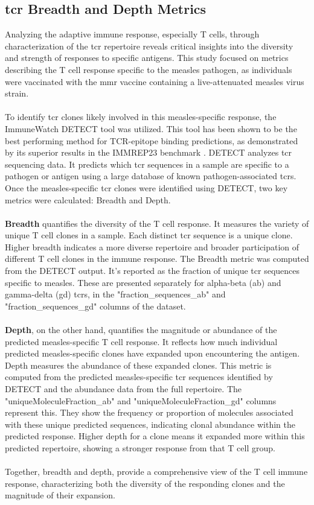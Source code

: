 \documentclass[12pt,a4paper]{report}
\begin{document}
\subsection{\gls{tcr} Breadth and Depth Metrics}
Analyzing the adaptive immune response, especially T cells, through characterization of the \gls{tcr} repertoire reveals critical insights into the diversity and strength of responses to specific antigens. This study focused on metrics describing the T cell response specific to the measles pathogen, as individuals were vaccinated with the \gls{mmr} vaccine containing a live-attenuated measles virus strain.\\
\\
To identify \gls{tcr} clones likely involved in this measles-specific response, the ImmuneWatch DETECT tool \cite{ImmuneDetectDocs} was utilized. This tool has been shown to be the best performing method for TCR-epitope binding predictions, as demonstrated by its superior results in the IMMREP23 benchmark \cite{benchmarking_paper_2024}. DETECT analyzes \gls{tcr} sequencing data. It predicts which \gls{tcr}  sequences in a sample are specific to a pathogen or antigen using a large database of known pathogen-associated \gls{tcr}s. Once the measles-specific \gls{tcr} clones were identified using DETECT, two key metrics were calculated: Breadth and Depth.\\
\\
\textbf{Breadth} quantifies the diversity of the T cell response. It measures the variety of unique T cell clones in a sample. Each distinct \gls{tcr} sequence is a unique clone. Higher breadth indicates a more diverse repertoire and broader participation of different T cell clones in the immune response. The Breadth metric was computed from the DETECT output. It's reported as the fraction of unique \gls{tcr} sequences specific to measles. These are presented separately for alpha-beta (ab) and gamma-delta (gd) \gls{tcr}s, in the "fraction\_sequences\_ab" and "fraction\_sequences\_gd" columns of the dataset.\\
\\
\textbf{Depth}, on the other hand, quantifies the magnitude or abundance of the predicted measles-specific T cell response. It reflects how much individual predicted measles-specific clones have expanded upon encountering the antigen. Depth measures the abundance of these expanded clones. This metric is computed from the predicted measles-specific \gls{tcr} sequences identified by DETECT and the abundance data from the full repertoire. The "uniqueMoleculeFraction\_ab" and "uniqueMoleculeFraction\_gd" columns represent this. They show the frequency or proportion of molecules associated with these unique predicted sequences, indicating clonal abundance within the predicted response. Higher depth for a clone means it expanded more within this predicted repertoire, showing a stronger response from that T cell group.\\
\\
Together, breadth and depth, provide a comprehensive view of the T cell immune response, characterizing both the diversity of the responding clones and the magnitude of their expansion.
\end{document}
